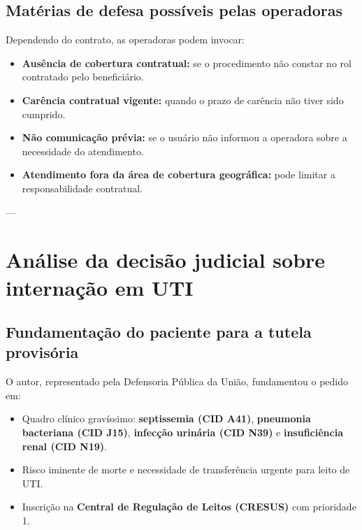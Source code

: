 \documentclass[12pt]{article}
\begin{document}
\subsection*{Matérias de defesa possíveis pelas operadoras}
\label{sec:orgaae294c}
Dependendo do contrato, as operadoras podem invocar:
\begin{itemize}
\item \textbf{\textbf{Ausência de cobertura contratual:}} se o procedimento não constar no rol contratado pelo beneficiário.
\item \textbf{\textbf{Carência contratual vigente:}} quando o prazo de carência não tiver sido cumprido.
\item \textbf{\textbf{Não comunicação prévia:}} se o usuário não informou a operadora sobre a necessidade do atendimento.
\item \textbf{\textbf{Atendimento fora da área de cobertura geográfica:}} pode limitar a responsabilidade contratual.
\end{itemize}

---

\section*{Análise da decisão judicial sobre internação em UTI}
\label{sec:orgad4413d}

\subsection*{Fundamentação do paciente para a tutela provisória}
\label{sec:orgbebb9dc}
O autor, representado pela Defensoria Pública da União, fundamentou o pedido em:
\begin{itemize}
\item Quadro clínico gravíssimo: \textbf{\textbf{septissemia (CID A41)}}, \textbf{\textbf{pneumonia bacteriana (CID J15)}}, \textbf{\textbf{infecção urinária (CID N39)}} e \textbf{\textbf{insuficiência renal (CID N19)}}.
\item Risco iminente de morte e necessidade de transferência urgente para leito de UTI.
\item Inscrição na \textbf{\textbf{Central de Regulação de Leitos (CRESUS)}} com prioridade 1.
\end{itemize}
\end{document}
